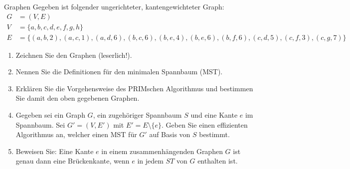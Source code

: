 \documentclass{article}
\begin{document}
\begin{exercise}{Graphen}
  Gegeben ist folgender ungerichteter, kantengewichteter Graph:
  \begin{align*}
    G & = (V, E)                                                                                                           \\
    V & = \{a, b, c, d, e, f, g, h\}                                                                                       \\
    E & = \{(a, b, 2), (a, c, 1), (a, d, 6), (b, c, 6), (b, e, 4), (b, e, 6), (b, f, 6), (c, d, 5), (c, f, 3), (c, g, 7)\}
  \end{align*}
  \begin{enumerate}
    \item Zeichnen Sie den Graphen (leserlich!).
    \item Nennen Sie die Definitionen für den minimalen Spannbaum (MST).
    \item Erklären Sie die Vorgehensweise des PRIMschen Algorithmus und bestimmen Sie damit den oben gegebenen Graphen.
    \item Gegeben sei ein Graph $G$, ein zugehöriger Spannbaum $S$ und eine Kante $e$ im Spannbaum. Sei $G' = (V, E')$ mit $E' = E \setminus \{e\}$. Geben Sie einen effizienten Algorithmus an, welcher einen MST für $G'$ auf Basis von $S$ bestimmt.
    \item Beweisen Sie: Eine Kante $e$ in einem zusammenhängenden Graphen $G$ ist genau dann eine Brückenkante, wenn $e$ in jedem $ST$ von $G$ enthalten ist.
  \end{enumerate}
\end{exercise}
\end{document}
